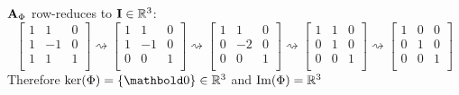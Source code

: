 \documentclass[11pt]{article}
\begin{document}
\begin{enumerate}
\begin{enumerate}
                    $\mathbf{A}_\Phi$ row-reduces to $\mathbf{I} \in \mathbb{R}^3$:
                    \[
                        \begin{bmatrix}
                            1 & 1  & 0 \\
                            1 & -1 & 0 \\
                            1 & 1  & 1 \\
                        \end{bmatrix}
                        \rightsquigarrow
                        \begin{bmatrix}
                            1 & 1  & 0 \\
                            1 & -1 & 0 \\
                            0 & 0  & 1 \\
                        \end{bmatrix}
                        \rightsquigarrow
                        \begin{bmatrix}
                            1 & 1  & 0 \\
                            0 & -2 & 0 \\
                            0 & 0  & 1 \\
                        \end{bmatrix}
                        \rightsquigarrow
                        \begin{bmatrix}
                            1 & 1 & 0 \\
                            0 & 1 & 0 \\
                            0 & 0 & 1 \\
                        \end{bmatrix}
                        \rightsquigarrow
                        \begin{bmatrix}
                            1 & 0 & 0 \\
                            0 & 1 & 0 \\
                            0 & 0 & 1 \\
                        \end{bmatrix}
                    \]
                    Therefore $\ker(\Phi) = \{ \vect{0} \} \in \R^3$ and $\operatorname{Im}(\Phi) = \mathbb{R}^3$


\end{enumerate}
\end{enumerate}
\end{document}
